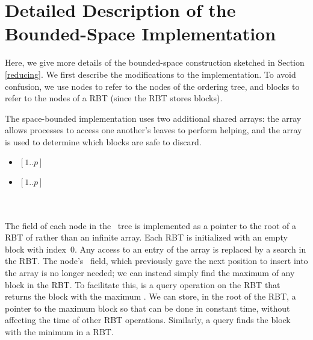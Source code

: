 
\section{Detailed Description of the Bounded-Space Implementation}
\label{reducing-details}


\renewcommand{\algorithmiccomment}[1]{\hfill\eqparbox{COMMENTSINGLEAPP}{\com\ #1}}

Here, we give more details of the bounded-space construction sketched in Section \ref{reducing}.
We first describe the modifications to the implementation.
To avoid confusion, we use nodes to refer to the nodes of the ordering tree, and blocks to refer
to the nodes of a RBT (since the RBT stores blocks).

The space-bounded implementation uses two additional shared arrays:
the  array allows processes to access one another's leaves to perform helping, and
the  array is used to determine which blocks are safe to discard.
\begin{itemize}
\item {} $[1..p]$ 
\item {} $[1..p]$ \\
\mbox{ }\\
\mbox{ }
\end{itemize}

The  field of each node in the \ordering\ tree is implemented as a pointer to the root of a RBT of  rather than an infinite array.  
Each RBT is initialized with an empty block with index~0.
Any access to an entry of the  array is replaced by a search in the RBT.
The node's \head\ field, which previously gave the next position to insert into the  array is no
longer needed; we can instead simply find the maximum  of any block in the RBT.
To facilitate this,  is a query operation on the RBT that 
returns the block with the maximum .
We can store, in the root of the RBT, a pointer to the maximum block so that 
can be done in constant time, without affecting the time of other RBT operations.
Similarly, a  query finds the block with the minimum  in a RBT.

